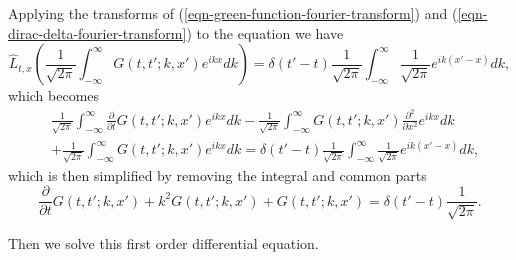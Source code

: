Applying the transforms of (\ref{eqn-green-function-fourier-transform}) and (\ref{eqn-dirac-delta-fourier-transform}) to the equation we have
\begin{equation}
    \hat L_{t,x}\left( \frac{1}{\sqrt{2\pi}}\int_{-\infty}^\infty G(t,t';k,x')  e^{i kx} dk \right) = \delta(t'-t) \frac{1}{\sqrt{2\pi}} \int_{-\infty}^\infty \frac{1}{\sqrt{2\pi}}  e^{i k(x'-x)} dk,
\end{equation}
which becomes
\begin{align*}
    &\frac{1}{\sqrt{2\pi}}\int_{-\infty}^\infty \frac{\partial}{\partial t}  G(t,t';k,x') e^{ikx}dk - \frac{1}{\sqrt{2\pi}}\int_{-\infty}^\infty  G(t,t';k,x') \frac{\partial^2}{\partial x^2} e^{ikx}dk  \\
    &+  \frac{1}{\sqrt{2\pi}}\int_{-\infty}^\infty G(t,t';k,x')e^{ikx}dk = \delta(t'-t) \frac{1}{\sqrt{2\pi}} \int_{-\infty}^\infty \frac{1}{\sqrt{2\pi}} e^{ik(x'-x)} dk,
\end{align*}
which is then simplified by removing the integral and common parts
\begin{equation}
    \frac{\partial}{\partial t} G(t,t';k,x')  + k^2 G(t,t';k,x') + G(t,t';k,x') = \delta(t'-t) \frac{1}{\sqrt{2\pi}} .
\end{equation}

Then we solve this first order differential equation.

